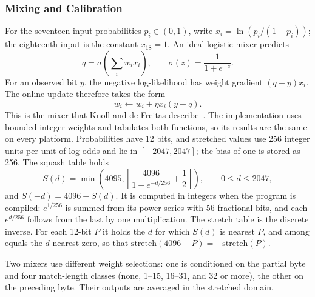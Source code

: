 \documentclass[10pt,letterpaper]{article}
\begin{document}
\subsubsection{Mixing and Calibration}
For the seventeen input probabilities $p_i\in(0,1)$, write $x_i=\ln(p_i/(1-p_i))$; the eighteenth input is the constant $x_{18}=1$. An ideal logistic mixer predicts
\begin{equation}
  q=\sigma\!\left(\sum_i w_i x_i\right),\qquad
  \sigma(z)=\frac{1}{1+e^{-z}}.
\end{equation}
For an observed bit $y$, the negative log-likelihood has weight gradient $(q-y)x_i$. The online update therefore takes the form
\begin{equation}
  w_i\leftarrow w_i+\eta x_i(y-q).
\end{equation}
This is the mixer that Knoll and de Freitas describe~\cite[Sec.~3.2]{knoll}. The implementation uses bounded integer weights and tabulates both functions, so its results are the same on every platform. Probabilities have 12 bits, and stretched values use 256 integer units per unit of log odds and lie in $[-2047,2047]$; the bias of one is stored as 256. The squash table holds
\begin{equation}
 S(d)=\min\!\left(4095,\left\lfloor\frac{4096}{1+e^{-d/256}}+\frac12\right\rfloor\right),\qquad 0\leq d\leq2047,
\end{equation}
and $S(-d)=4096-S(d)$. It is computed in integers when the program is compiled: $e^{1/256}$ is summed from its power series with 56 fractional bits, and each $e^{d/256}$ follows from the last by one multiplication. The stretch table is the discrete inverse. For each 12-bit $P$ it holds the $d$ for which $S(d)$ is nearest $P$, and among equals the $d$ nearest zero, so that $\mathrm{stretch}(4096-P)=-\mathrm{stretch}(P)$.

Two mixers use different weight selections: one is conditioned on the partial byte and four match-length classes (none, 1--15, 16--31, and 32 or more), the other on the preceding byte. Their outputs are averaged in the stretched domain.
\end{document}
